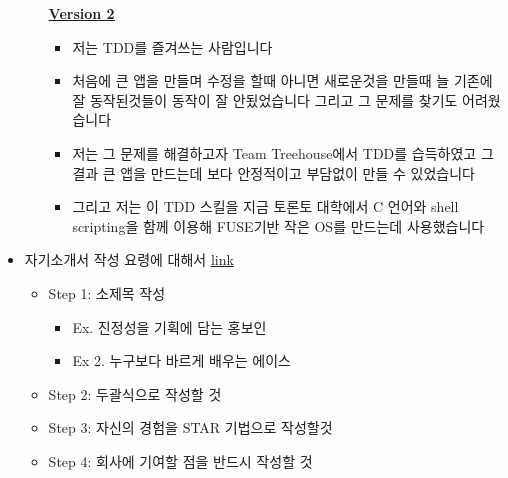 \documentclass[12pt]{article}
\begin{document}
\begin{itemize}
\begin{itemize}
        \bigskip

        \underline{\textbf{Version 2}}

        \bigskip

        \begin{itemize}
            \item 저는 TDD를 즐겨쓰는 사람입니다
            \item 처음에 큰 앱을 만들며 수정을 할때 아니면 새로운것을 만들때 늘 기존에 잘 동작된것들이 동작이 잘 안됬었습니다 그리고 그 문제를 찾기도 어려웠습니다
            \item 저는 그 문제를 해결하고자 Team Treehouse에서 TDD를 습득하였고 그 결과
            큰 앱을 만드는데 보다 안정적이고 부담없이 만들 수 있었습니다
            \item 그리고 저는 이 TDD 스킬을 지금 토론토 대학에서 C 언어와 shell scripting을 함께 이용해 FUSE기반 작은 OS를 만드는데 사용했습니다
        \end{itemize}
    \end{itemize}
    \item 자기소개서 작성 요령에 대해서 \href{https://brunch.co.kr/@hklim/11}{link}
    \begin{itemize}
        \item Step 1: 소제목 작성
        \begin{itemize}
            \item Ex. 진정성을 기휙에 담는 홍보인
            \item Ex 2. 누구보다 바르게 배우는 에이스
        \end{itemize}
        \item Step 2: 두괄식으로 작성할 것
        \item Step 3: 자신의 경험을 STAR 기법으로 작성할것
        \item Step 4: 회사에 기여할 점을 반드시 작성할 것
    \end{itemize}
\end{itemize}
\end{document}
